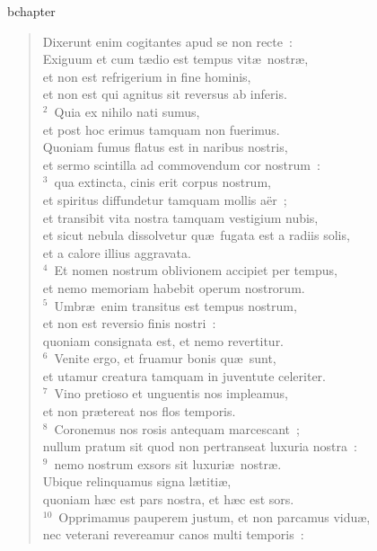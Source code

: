 bchapter\begin{verse}\vspace{-19pt}Dixerunt enim cogitantes apud se non recte~:\\ Exiguum et cum t\ae dio est tempus vit\ae\ nostr\ae ,\\ et non est refrigerium in fine hominis,\\ et non est qui agnitus sit reversus ab inferis.\\
${}^{2}$~Quia ex nihilo nati sumus,\\ et post hoc erimus tamquam non fuerimus.\\ Quoniam fumus flatus est in naribus nostris,\\ et sermo scintilla ad commovendum cor nostrum~:\\
${}^{3}$~qua extincta, cinis erit corpus nostrum,\\ et spiritus diffundetur tamquam mollis a\"er~;\\ et transibit vita nostra tamquam vestigium nubis,\\ et sicut nebula dissolvetur qu\ae\ fugata est a radiis solis,\\ et a calore illius aggravata.\\
${}^{4}$~Et nomen nostrum oblivionem accipiet per tempus,\\ et nemo memoriam habebit operum nostrorum.\\
${}^{5}$~Umbr\ae\ enim transitus est tempus nostrum,\\ et non est reversio finis nostri~:\\ quoniam consignata est, et nemo revertitur.\\
${}^{6}$~Venite ergo, et fruamur bonis qu\ae\ sunt,\\ et utamur creatura tamquam in juventute celeriter.\\
${}^{7}$~Vino pretioso et unguentis nos impleamus,\\ et non pr\ae tereat nos flos temporis.\\
${}^{8}$~Coronemus nos rosis antequam marcescant~;\\ nullum pratum sit quod non pertranseat luxuria nostra~:\\
${}^{9}$~nemo nostrum exsors sit luxuri\ae\ nostr\ae .\\ Ubique relinquamus signa l\ae titi\ae ,\\ quoniam h\ae c est pars nostra, et h\ae c est sors.\\
${}^{10}$~Opprimamus pauperem justum, et non parcamus vidu\ae ,\\ nec veterani revereamur canos multi temporis~:\\

\end{verse}
